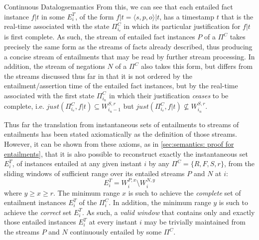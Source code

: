 \begin{nestedsection}{Continuous Datalog}{semantics}
From this, we can see that each entailed fact instance ${f|t}$ in some
$E^T_{i}$, of the form ${f|t = \langle s, p, o \rangle | t}$, has a
timestamp $t$ that is the real-time associated with the state
$\Pi^C_{i_{e}}$ in which its particular justification for ${f|t}$ is
first complete. As such, the stream of entailed fact instances $P$ of
a $\Pi^C$ takes precisely the same form as the streams of facts already
described, thus producing a concise stream of entailments that may be
read by further stream processing.  In addition, the stream of negations
$N$ of a $\Pi^C$ also takes this form, but differs from the streams
discussed thus far in that it is not ordered by the entailment/assertion
time of the entailed fact instances, but by the real-time associated
with the first state $\Pi^C_{i_{n}}$ in which their justification
\emph{ceases} to be complete, i.e. ${just(\Pi^C_{i_{e}}, f|t) \subseteq W^{S,r}_{i_n - 1}}$
but ${just(\Pi^C_{i_{e}}, f|t) \not\subseteq W^{S,r}_{i_n}}$.

Thus far the translation from instantaneous sets of entailments to
streams of entailments has been stated axiomatically as the definition
of those streams.  However, it can be shown from these axioms, as in
\ref{sec:semantics: proof for entailments}, that it is also possible
to reconstruct exactly the instantaneous set $E^T_{i}$, of instances
entailed at any given instant $i$ by any $\Pi^C = \{ R, F, S, r \}$,
from the sliding windows of sufficient range over its entailed streams
$P$ and $N$ at $i$:
\[ E^T_{i} = W^{P,x}_{i} \setminus W^{N,y}_{i} \]
where ${y \geq x \geq r}$. The minimum range $x$ is such to achieve
the \emph{complete} set of entailment instances $E^T_{i}$ of the
$\Pi^C_{i}$. In addition, the minimum range $y$ is such to achieve the
\emph{correct} set $E^T_{i}$. As such, a \emph{valid window} that
contains only and exactly those entailed instances $E^T_{i}$ at every
instant $i$ may be trivially maintained from the streams $P$ and $N$
continuously entailed by some $\Pi^C$.




\end{nestedsection}
